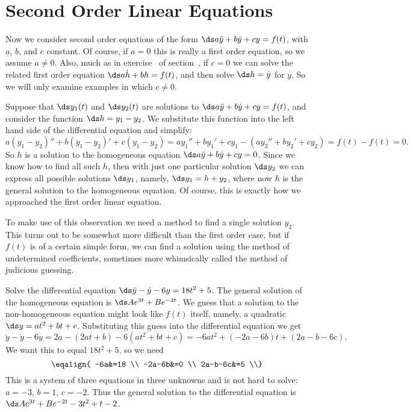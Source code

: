 \section{Second Order Linear Equations}{}{}
\nobreak
Now we consider second order equations of the form $\ds a\ddot y+b\dot
y+cy=f(t)$, with $a$, $b$, and $c$ constant. Of course, if $a=0$ this
is really a first order equation, so we assume $a\not=0$.
Also, much
as in exercise~ of
section~, if $c=0$ we can solve
the related first order equation $\ds a\dot h+bh=f(t)$, and then solve
$\ds h=\dot y$ for $y$. So we will only examine examples in which
$c\not=0$.

Suppose that
$\ds y_1(t)$ and $\ds y_2(t)$ are solutions to $\ds a\ddot y+b\dot
y+cy=f(t)$, and consider the function $\ds h=y_1-y_2$. We substitute
this function into the left hand side of the differential equation and
simplify: 
$$
a(y_1-y_2)''+b(y_1-y_2)'+c(y_1-y_2)=ay_1''+by_1'+cy_1 -
(ay_2''+by_2'+cy_2)=f(t)-f(t)=0.
$$ 
So $h$ is a solution to the homogeneous equation $\ds a\ddot
y+b\dot y+cy=0$. Since we know how to find all such $h$, then with
just one particular solution $\ds y_2$ we can express all possible
solutions $\ds y_1$, namely, $\ds y_1=h+y_2$, where now $h$ is the
general solution to the homogeneous equation. Of course, this is
exactly how we approached the first order linear equation.

To make use of this observation we need a method to find a single
solution $y_2$. This turns out to be somewhat more difficult than the
first order case, but if $f(t)$ is of a certain simple form, we can
find a solution using the {\dfont method of undetermined
  coefficients}, sometimes 
more whimsically called the
{\dfont method of judicious guessing}.

\begin{example} Solve the differential equation $\ds \ddot y-\dot
y-6y=18t^2+5$. The general solution of the homogeneous equation is
$\ds Ae^{3t}+Be^{-2t}$. We guess that a solution to the
non-homogeneous equation might look like $f(t)$ itself, namely,
a quadratic $\ds y=at^2+bt+c$. Substituting this guess into the
differential equation we get
$$
\ddot y-\dot y-6y = 2a-(2at+b)-6(at^2+bt+c) = -6at^2+(-2a-6b)t+(2a-b-6c).
$$
We want this to equal $18t^2+5$, so we need 
$$\eqalign{
-6a&=18 \\
-2a-6b&=0 \\
2a-b-6c&=5 \\}
$$
This is a system of three equations in three unknowns and is not hard
to solve: $a=-3$, $b=1$, $c=-2$. Thus the general solution to the
differential equation is $\ds Ae^{3t}+Be^{-2t}-3t^2+t-2$.
\end{example}

